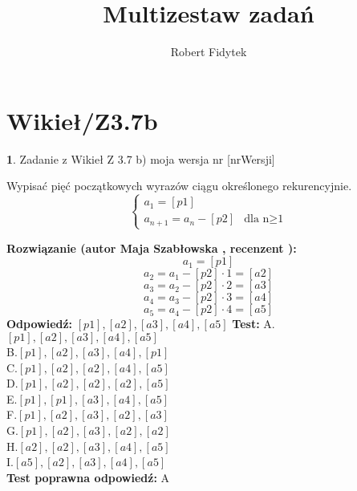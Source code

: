 \documentclass[12pt, a4paper]{article}
\title{Multizestaw zadań}
\author{Robert Fidytek}
\date{}
\theoremstyle{definition} %
\newtheorem{zad}{}
\newcommand{\kategoria}[1]{\section{#1}} %
\newcommand{\zadStart}[1]{\begin{zad}#1\newline} %
\newcommand{\zadStop}{\end{zad}}   %
\newcommand{\rozwStart}[2]{\noindent \textbf{Rozwiązanie (autor #1 , recenzent #2): }\newline} %
\newcommand{\rozwStop}{\newline}                                            %
\newcommand{\odpStart}{\noindent \textbf{Odpowiedź:}\newline}    %
\newcommand{\odpStop}{\newline}                                             %
\newcommand{\testStart}{\noindent \textbf{Test:}\newline} %
\newcommand{\testStop}{\newline} %
\newcommand{\kluczStart}{\noindent \textbf{Test poprawna odpowiedź:}\newline} %
\newcommand{\kluczStop}{\newline} %
\begin{document}
\maketitle


\kategoria{Wikieł/Z3.7b}
\zadStart{Zadanie z Wikieł Z 3.7 b)  moja wersja nr [nrWersji]}

Wypisać pięć początkowych wyrazów ciągu określonego rekurencyjnie.
$$\left\{ \begin{array}{ll}
a_{1}=[p1]\\
a_{n+1}=a_{n}-[p2]& \textrm{dla n$\geq$1} 
\end{array} \right.
$$
\zadStop
\rozwStart{Maja Szabłowska}{}
$$a_{1}=[p1]$$
$$a_{2}=a_{1}-[p2]\cdot1=[a2]$$
$$a_{3}=a_{2}-[p2]\cdot2=[a3]$$
$$a_{4}=a_{3}-[p2]\cdot3=[a4]$$
$$a_{5}=a_{4}-[p2]\cdot4=[a5]$$
\rozwStop
\odpStart
$[p1],[a2],[a3],[a4],[a5]$
\odpStop
\testStart
A.$[p1],[a2],[a3],[a4],[a5]$\\
B.$[p1],[a2],[a3],[a4],[p1]$\\
C.$[p1],[a2],[a2],[a4],[a5]$\\
D.$[p1],[a2],[a2],[a2],[a5]$\\
E.$[p1],[p1],[a3],[a4],[a5]$\\
F.$[p1],[a2],[a3],[a2],[a3]$\\
G.$[p1],[a2],[a3],[a2],[a2]$\\
H.$[a2],[a2],[a3],[a4],[a5]$\\
I.$[a5],[a2],[a3],[a4],[a5]$\\
\testStop
\kluczStart
A
\kluczStop
\end{document}
